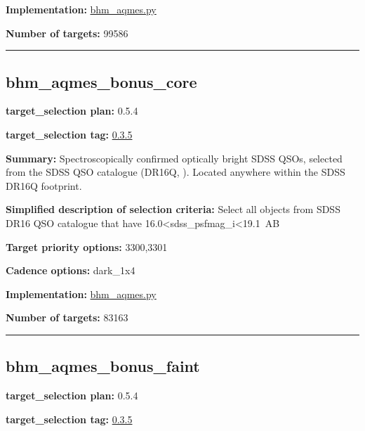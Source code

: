 \noindent\textbf{Implementation:}
\href{https://github.com/sdss/target_selection/blob/0.3.5/python/target_selection/cartons/bhm_aqmes.py}{bhm\_aqmes.py}

\noindent\textbf{Number of targets:} 99586

\begin{center}\rule{0.5\linewidth}{0.5pt}\end{center}

\hypertarget{bhm_aqmes_bonus_core_plan0.5.4}{%
\subsection{bhm\_aqmes\_bonus\_core}\label{bhm_aqmes_bonus_core_plan0.5.4}}

\noindent\textbf{target\_selection plan:} 0.5.4

\noindent\textbf{target\_selection tag:}
\href{https://github.com/sdss/target_selection/tree/0.3.5/}{0.3.5}

\noindent\textbf{Summary:} Spectroscopically confirmed optically bright SDSS
QSOs, selected from the SDSS QSO catalogue (DR16Q,
\citealt{Lyke2020}). Located anywhere within the SDSS DR16Q footprint.

\noindent\textbf{Simplified description of selection criteria:} Select all
objects from SDSS DR16 QSO catalogue that have
16.0\textless{}sdss\_psfmag\_i\textless{}19.1~AB


\noindent\textbf{Target priority options:} 3300,3301

\noindent\textbf{Cadence options:} dark\_1x4

\noindent\textbf{Implementation:}
\href{https://github.com/sdss/target_selection/blob/0.3.5/python/target_selection/cartons/bhm_aqmes.py}{bhm\_aqmes.py}

\noindent\textbf{Number of targets:} 83163

\begin{center}\rule{0.5\linewidth}{0.5pt}\end{center}

\hypertarget{bhm_aqmes_bonus_faint_plan0.5.4}{%
\subsection{bhm\_aqmes\_bonus\_faint}\label{bhm_aqmes_bonus_faint_plan0.5.4}}

\noindent\textbf{target\_selection plan:} 0.5.4

\noindent\textbf{target\_selection tag:}
\href{https://github.com/sdss/target_selection/tree/0.3.5/}{0.3.5}

